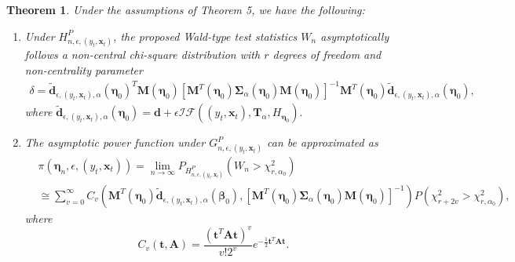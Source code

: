 \documentclass[a4paper]{article}%
\newtheorem{theorem}{Theorem}
\begin{document}
\begin{theorem}
\label{THM:7asymp_power_one} Under the assumptions of Theorem 5, we have the following:

\begin{enumerate}
\item Under $H_{n,\epsilon,(y_{t},\boldsymbol{x}_{t})}^{P}$, the proposed
Wald-type test statistics $W_{n}$ asymptotically follows a non-central
chi-square distribution with $r$ degrees of freedom and  non-centrality
parameter
\begin{align}
\delta= \widetilde{\boldsymbol{d}}_{\epsilon,(y_{t},\boldsymbol{x}_{t}%
),\alpha}(\boldsymbol{\eta}_{0})^{T} \boldsymbol{M}(\boldsymbol{\eta}_{0})
\left[  \boldsymbol{M}^{T}(\boldsymbol{\eta}_{0})\boldsymbol{\Sigma}_{\alpha
}\left(  \boldsymbol{\eta}_{0}\right)  \boldsymbol{M}(\boldsymbol{\eta}%
_{0})\right]  ^{-1}\boldsymbol{M}^{T}(\boldsymbol{\eta}_{0})
\widetilde{\boldsymbol{d}}_{\epsilon,(y_{t},\boldsymbol{x}_{t}),\alpha
}(\boldsymbol{\eta}_{0}),\label{EQ:delta}%
\end{align}
where $\widetilde{\boldsymbol{d}}_{\epsilon,(y_{t},\boldsymbol{x}_{t}),\alpha
}(\boldsymbol{\eta}_{0}) =\boldsymbol{d}+\epsilon\mathcal{IF}((y_{t}%
,\boldsymbol{x}_{t}),\boldsymbol{T}_{\alpha},H_{\boldsymbol{\eta}_{0}}).$

\item The asymptotic power function under $G_{n,\epsilon,(y_{t},\boldsymbol{x}%
_{t})}^{P}$ can be approximated as
\begin{align}
&  \pi(\boldsymbol{\eta}_{n},\epsilon,(y_{t},\boldsymbol{x}_{t})) =
\lim\limits_{n\rightarrow\infty}P_{H_{n,\epsilon,(y_{t},\boldsymbol{x}_{t}%
)}^{P}}(W_{n}>\chi_{r,\alpha_0}^{2})\nonumber\\
&  \cong\sum\limits_{v=0}^{\infty} C_{v}\left(  \boldsymbol{M}^{T}%
(\boldsymbol{\eta}_{0})\widetilde{\boldsymbol{d}}_{\epsilon,(y_{t}%
,\boldsymbol{x}_{t}),\alpha}(\boldsymbol{\beta}_{0}), \left[  \boldsymbol{M}%
^{T}(\boldsymbol{\eta}_{0})\boldsymbol{\Sigma}_{\alpha}\left(
\boldsymbol{\eta}_{0}\right)  \boldsymbol{M}(\boldsymbol{\eta}_{0})\right]
^{-1}\right)  P\left(  \chi_{r+2v}^{2}>\chi_{r,\alpha_0}^{2}\right)  ,
\end{align}
where
\[
C_{v}\left(  \boldsymbol{t},\boldsymbol{A}\right)  =\frac{\left(
\mathbf{t}^{T}\boldsymbol{A}\mathbf{t}\right)  ^{v}}{v!2^{v}}e^{-\frac{1}
{2}\mathbf{t}^{T}\boldsymbol{A}\mathbf{t}}.
\]

\end{enumerate}
\end{theorem}
\end{document}
